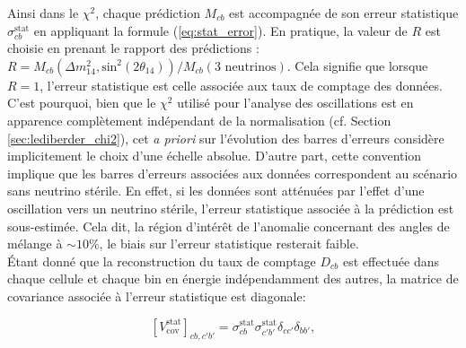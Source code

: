 {\begin{figure}[h!]
\end{figure}

\clearpage

%
%





}

Ainsi dans le $\chi^2$, chaque prédiction $M_{cb}$ est accompagnée de son erreur statistique $\sigma_{cb}^\textrm{stat}$ en appliquant la formule (\ref{eq:stat_error}). En pratique, la valeur de $R$ est choisie en prenant le rapport des prédictions : $R = M_{cb}(\Delta m^2_{14}, \textrm{sin}^2(2\theta_{14}))/M_{cb}(\textrm{3 neutrinos})$. Cela signifie que lorsque $R=1$, l'erreur statistique est celle associée aux taux de comptage des données. C'est pourquoi, bien que le $\chi^2$ utilisé pour l'analyse des oscillations est en apparence complètement indépendant de la normalisation (cf. Section \ref{sec:lediberder_chi2}), cet \textit{a priori} sur l'évolution des barres d'erreurs considère implicitement le choix d'une échelle absolue. D'autre part, cette convention implique que les barres d'erreurs associées aux  données correspondent au scénario sans neutrino stérile. En effet, si les données sont atténuées par l'effet d'une oscillation vers un neutrino stérile, l'erreur statistique associée à la prédiction est sous-estimée. Cela dit, la région d'intérêt de l'anomalie concernant des angles de mélange à $\sim 10 \%$, le biais sur l'erreur statistique resterait faible.\\

Étant donné que la reconstruction du taux de comptage $D_{cb}$ est effectuée dans chaque cellule et chaque bin en énergie indépendamment des autres, la matrice de covariance associée à l'erreur statistique est diagonale:

\begin{equation}
    \left[V_\textrm{cov}^\textrm{stat}\right]_{cb,c'b'} = \sigma_{cb}^\textrm{stat} \sigma_{c'b'}^\textrm{stat} \delta_{cc'}\delta_{bb'},
\end{equation}

